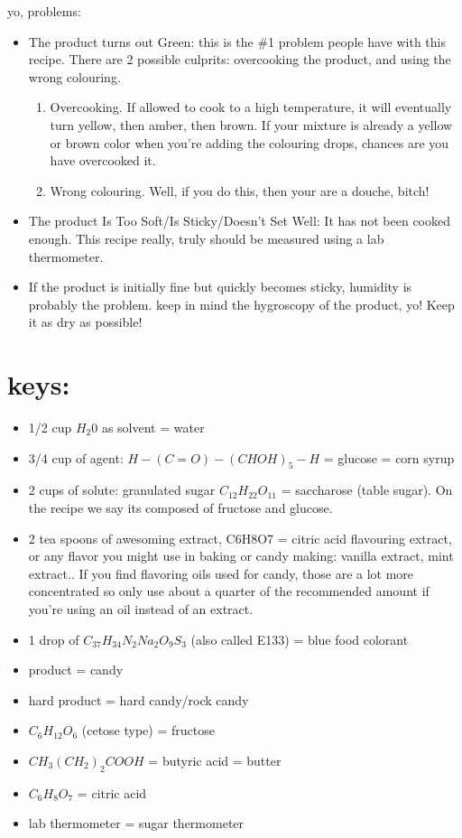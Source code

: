 \documentclass[a4paper,10pt]{article}
\begin{document}
yo, problems:
\begin{itemize}
 \item The product turns out Green: this is the \#1 problem people have with this
  recipe. There are 2 possible culprits: overcooking the product, and using the
  wrong colouring. 
  \begin{enumerate}
   \item Overcooking.  If allowed to cook to a high temperature, it
  will eventually turn yellow, then amber, then brown. If your mixture is already
  a yellow or brown color when you’re adding the colouring drops, chances are you
  have overcooked it. 
  \item  Wrong colouring. Well, if you do this, then your are a
  douche, bitch!
  \end{enumerate}

  \item The product Is Too Soft/Is Sticky/Doesn’t Set Well: It has not been cooked
enough. This recipe really, truly should be measured using a lab thermometer.
  \item If the product is initially fine but quickly becomes sticky, humidity is
probably the problem. keep in mind the hygroscopy of the product, yo! Keep it as
dry as possible!
\end{itemize}
\normalfont

\newpage
\section*{keys:} 
\begin{itemize}  
    \item 1/2 cup $H_{2}0$ as solvent = water  
    \item 3/4 cup of agent: $H-(C=O)-(CHOH)_{5}-H$ = glucose = corn syrup  
    \item 2 cups of solute:  granulated sugar $C_{12}H_{22}O_{11}$ = saccharose (table sugar). On the recipe we
    say its composed of fructose and glucose.  
    \item 2 tea spoons of awesoming
    extract, C6H8O7 = citric acid flavouring extract, or any flavor you might use in
    baking or candy making: vanilla extract, mint extract.. If you find flavoring
    oils used for candy, those are a lot more concentrated so only use about a
    quarter of the recommended amount if you’re using an oil instead of an extract.
    \item 1 drop of $C_{37}H_{34}N_{2}Na_{2}O_{9}S_{3}$ (also called E133) = blue food colorant  
    \item product = candy  
    \item hard product = hard candy/rock candy  
    \item $C_{6}H_{12}O_{6}$ (cetose type) = fructose  
    \item $CH_{3}(CH_{2})_{2}COOH$ = butyric acid = butter  
    \item $C_{6}H_{8}O_{7}$ = citric acid  
    \item lab thermometer = sugar thermometer 
\end{itemize}
\end{document}
